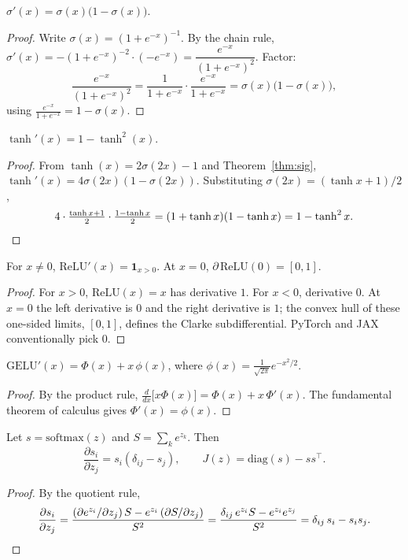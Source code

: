 \begin{theorem}\label{thm:sig}
$\sigma'(x) = \sigma(x)\bigl(1-\sigma(x)\bigr)$.
\end{theorem}
\begin{proof}
Write $\sigma(x)=(1+e^{-x})^{-1}$. By the chain rule,
$\sigma'(x) = -(1+e^{-x})^{-2}\cdot(-e^{-x}) = \dfrac{e^{-x}}{(1+e^{-x})^2}$. Factor:
\[
\frac{e^{-x}}{(1+e^{-x})^2} = \frac{1}{1+e^{-x}}\cdot\frac{e^{-x}}{1+e^{-x}} = \sigma(x)\bigl(1-\sigma(x)\bigr),
\]
using $\frac{e^{-x}}{1+e^{-x}} = 1-\sigma(x)$.
\end{proof}

\begin{theorem}
$\tanh'(x) = 1-\tanh^2(x)$.
\end{theorem}
\begin{proof}
From $\tanh(x) = 2\sigma(2x)-1$ and Theorem~\ref{thm:sig},
$\tanh'(x) = 4\sigma(2x)(1-\sigma(2x))$. Substituting $\sigma(2x) = (\tanh x + 1)/2$,
\[
4\cdot\tfrac{\tanh x+1}{2}\cdot\tfrac{1-\tanh x}{2} = (1+\tanh x)(1-\tanh x) = 1-\tanh^2 x. \qedhere
\]
\end{proof}

\begin{theorem}
For $x\neq 0$, $\mathrm{ReLU}'(x) = \mathbf{1}_{x>0}$. At $x=0$, $\partial\,\mathrm{ReLU}(0) = [0,1]$.
\end{theorem}
\begin{proof}
For $x>0$, $\mathrm{ReLU}(x)=x$ has derivative $1$. For $x<0$, derivative $0$. At $x=0$ the left derivative is $0$ and the right derivative is $1$; the convex hull of these one-sided limits, $[0,1]$, defines the Clarke subdifferential. PyTorch and JAX conventionally pick $0$.
\end{proof}

\begin{theorem}
$\mathrm{GELU}'(x) = \Phi(x) + x\,\phi(x)$, where $\phi(x) = \tfrac{1}{\sqrt{2\pi}}e^{-x^2/2}$.
\end{theorem}
\begin{proof}
By the product rule, $\frac{d}{dx}\bigl[x\Phi(x)\bigr] = \Phi(x) + x\,\Phi'(x)$. The fundamental theorem of calculus gives $\Phi'(x) = \phi(x)$.
\end{proof}

\begin{theorem}\label{thm:smj}
Let $s = \mathrm{softmax}(z)$ and $S = \sum_k e^{z_k}$. Then
\[
\frac{\partial s_i}{\partial z_j} = s_i(\delta_{ij} - s_j), \qquad J(z) = \mathrm{diag}(s) - s s^\top.
\]
\end{theorem}
\begin{proof}
By the quotient rule,
\[
\frac{\partial s_i}{\partial z_j} = \frac{(\partial e^{z_i}/\partial z_j)\,S - e^{z_i}\,(\partial S/\partial z_j)}{S^2} = \frac{\delta_{ij}\,e^{z_i} S - e^{z_i} e^{z_j}}{S^2} = \delta_{ij}\,s_i - s_i s_j. \qedhere
\]
\end{proof}

